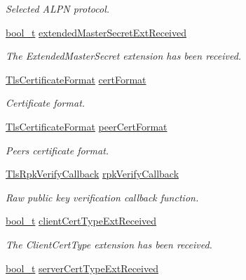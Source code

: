 \begin{DoxyCompactItemize}
\begin{DoxyCompactList}\small\item\em Selected A\+L\+PN protocol. \end{DoxyCompactList}\item 
\hyperlink{compiler__port_8h_a812d16e5494522586b3784e55d479912}{bool\+\_\+t} \hyperlink{struct__TlsContext_a185160342c5f985fe428d1712baa40f1}{extended\+Master\+Secret\+Ext\+Received}
\begin{DoxyCompactList}\small\item\em The Extended\+Master\+Secret extension has been received. \end{DoxyCompactList}\item 
\hyperlink{tls_8h_a14c2a51c1d8cf969aa455b69e405c0d0}{Tls\+Certificate\+Format} \hyperlink{struct__TlsContext_a72ea4936f53b890f0eabd14dca0b8d5b}{cert\+Format}
\begin{DoxyCompactList}\small\item\em Certificate format. \end{DoxyCompactList}\item 
\hyperlink{tls_8h_a14c2a51c1d8cf969aa455b69e405c0d0}{Tls\+Certificate\+Format} \hyperlink{struct__TlsContext_a2024bf1d4661aa0dfa40c686bbdcaa2f}{peer\+Cert\+Format}
\begin{DoxyCompactList}\small\item\em Peer\textquotesingle{}s certificate format. \end{DoxyCompactList}\item 
\hyperlink{tls_8h_ab1f0e6b85cdc60baae331dee4c1ec77b}{Tls\+Rpk\+Verify\+Callback} \hyperlink{struct__TlsContext_a4be426a57ac9bb294c3be53583521ec7}{rpk\+Verify\+Callback}
\begin{DoxyCompactList}\small\item\em Raw public key verification callback function. \end{DoxyCompactList}\item 
\hyperlink{compiler__port_8h_a812d16e5494522586b3784e55d479912}{bool\+\_\+t} \hyperlink{struct__TlsContext_a8afe0bc107677db7d4314287841979e4}{client\+Cert\+Type\+Ext\+Received}
\begin{DoxyCompactList}\small\item\em The Client\+Cert\+Type extension has been received. \end{DoxyCompactList}\item 
\hyperlink{compiler__port_8h_a812d16e5494522586b3784e55d479912}{bool\+\_\+t} \hyperlink{struct__TlsContext_a1bcf3cad648df615d0b4e5d0f36c1bc4}{server\+Cert\+Type\+Ext\+Received}

\end{DoxyCompactItemize}
